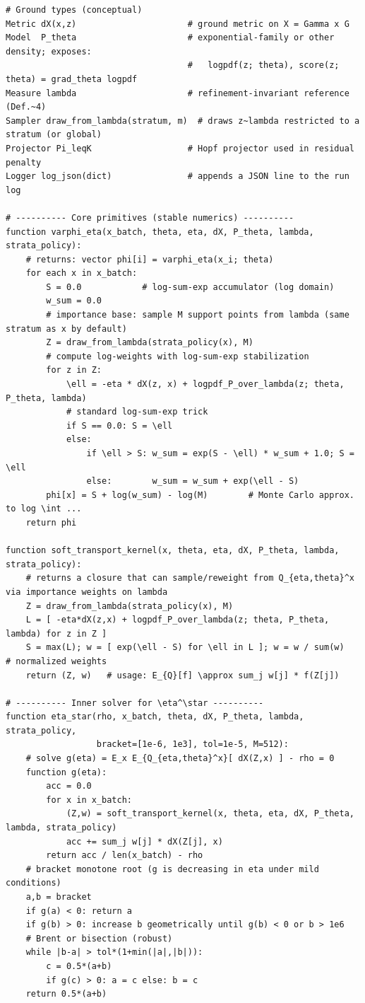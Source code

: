 \begin{lstlisting}
# Ground types (conceptual)
Metric dX(x,z)                      # ground metric on X = Gamma x G
Model  P_theta                      # exponential-family or other density; exposes:
                                    #   logpdf(z; theta), score(z; theta) = grad_theta logpdf
Measure lambda                      # refinement-invariant reference (Def.~4)
Sampler draw_from_lambda(stratum, m)  # draws z~lambda restricted to a stratum (or global)
Projector Pi_leqK                   # Hopf projector used in residual penalty
Logger log_json(dict)               # appends a JSON line to the run log

# ---------- Core primitives (stable numerics) ----------
function varphi_eta(x_batch, theta, eta, dX, P_theta, lambda, strata_policy):
    # returns: vector phi[i] = varphi_eta(x_i; theta)
    for each x in x_batch:
        S = 0.0            # log-sum-exp accumulator (log domain)
        w_sum = 0.0
        # importance base: sample M support points from lambda (same stratum as x by default)
        Z = draw_from_lambda(strata_policy(x), M)
        # compute log-weights with log-sum-exp stabilization
        for z in Z:
            \ell = -eta * dX(z, x) + logpdf_P_over_lambda(z; theta, P_theta, lambda)
            # standard log-sum-exp trick
            if S == 0.0: S = \ell
            else:
                if \ell > S: w_sum = exp(S - \ell) * w_sum + 1.0; S = \ell
                else:        w_sum = w_sum + exp(\ell - S)
        phi[x] = S + log(w_sum) - log(M)        # Monte Carlo approx. to log \int ...
    return phi

function soft_transport_kernel(x, theta, eta, dX, P_theta, lambda, strata_policy):
    # returns a closure that can sample/reweight from Q_{eta,theta}^x via importance weights on lambda
    Z = draw_from_lambda(strata_policy(x), M)
    L = [ -eta*dX(z,x) + logpdf_P_over_lambda(z; theta, P_theta, lambda) for z in Z ]
    S = max(L); w = [ exp(\ell - S) for \ell in L ]; w = w / sum(w)   # normalized weights
    return (Z, w)   # usage: E_{Q}[f] \approx sum_j w[j] * f(Z[j])

# ---------- Inner solver for \eta^\star ----------
function eta_star(rho, x_batch, theta, dX, P_theta, lambda, strata_policy,
                  bracket=[1e-6, 1e3], tol=1e-5, M=512):
    # solve g(eta) = E_x E_{Q_{eta,theta}^x}[ dX(Z,x) ] - rho = 0
    function g(eta):
        acc = 0.0
        for x in x_batch:
            (Z,w) = soft_transport_kernel(x, theta, eta, dX, P_theta, lambda, strata_policy)
            acc += sum_j w[j] * dX(Z[j], x)
        return acc / len(x_batch) - rho
    # bracket monotone root (g is decreasing in eta under mild conditions)
    a,b = bracket
    if g(a) < 0: return a
    if g(b) > 0: increase b geometrically until g(b) < 0 or b > 1e6
    # Brent or bisection (robust)
    while |b-a| > tol*(1+min(|a|,|b|)):
        c = 0.5*(a+b)
        if g(c) > 0: a = c else: b = c
    return 0.5*(a+b)


\end{lstlisting}
